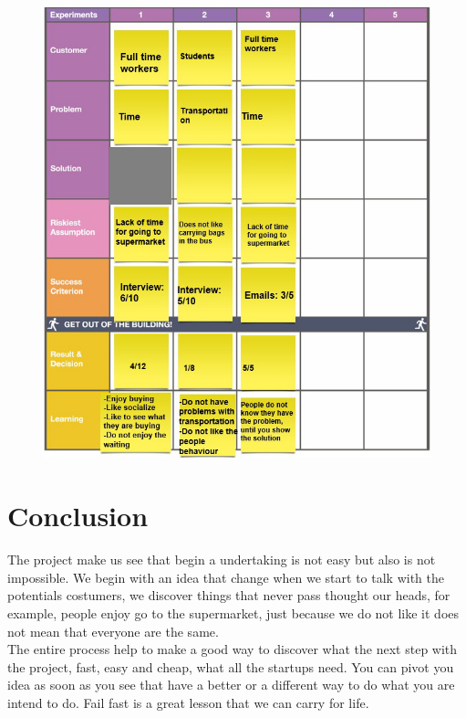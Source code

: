 \documentclass[12pt]{article}
\begin{document}
\begin{figure}[ht]
\centering
\includegraphics[scale=0.5]{experiments.jpg}
\end{figure}

\section{Conclusion}
The project make us see that begin a undertaking is not easy but also is not impossible. We begin with an idea that change when we start to talk with the potentials costumers, we discover things that never pass thought our heads, for example, people enjoy go to the supermarket, just because we do not like it does not mean that everyone are the same. \\
The entire process help to make a good way to discover what the next step with the project, fast, easy and cheap, what all the startups need. You can pivot you idea as soon as you see that have a better or a different way to do what you are intend to do. Fail fast is a great lesson that we can carry for life.       
\end{document}

